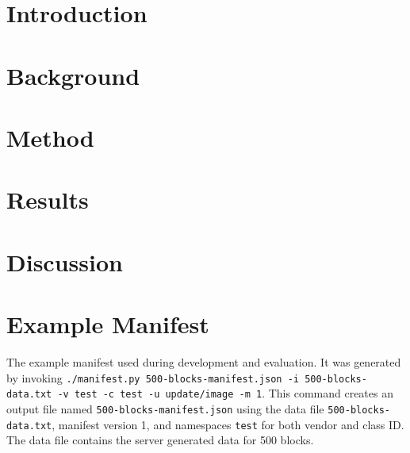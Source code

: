 \documentclass{kththesis}
\begin{document}

\chapter{Introduction}


\chapter{Background}


\chapter{Method}


\chapter{Results}


\chapter{Discussion}


\printbibliography[heading=bibintoc] %

\appendix

\chapter{Example Manifest}
\label{app:manifest}
The example manifest used during development and evaluation. It was generated by invoking
\texttt{./manifest.py 500-blocks-manifest.json -i 500-blocks-data.txt -v test -c test -u
update/image -m 1}. This command creates an output file named
\texttt{500-blocks-manifest.json} using the data file \texttt{500-blocks-data.txt},
manifest version 1, and namespaces \texttt{test} for both vendor and class ID. The data
file contains the server generated data for 500 blocks.


\end{document}

